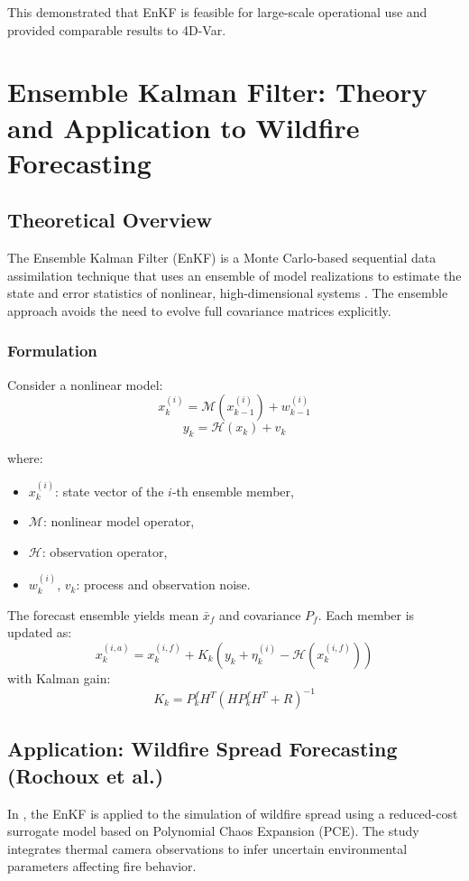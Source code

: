 \documentclass[a4paper]{article}
\begin{document}
This demonstrated that EnKF is feasible for large-scale operational use and provided comparable results to 4D-Var.

\section{Ensemble Kalman Filter: Theory and Application to Wildfire Forecasting}

\subsection{Theoretical Overview}

The Ensemble Kalman Filter (EnKF) is a Monte Carlo-based sequential data assimilation technique that uses an ensemble of model realizations to estimate the state and error statistics of nonlinear, high-dimensional systems \parencite{evensen1994sequential}. The ensemble approach avoids the need to evolve full covariance matrices explicitly.

\subsubsection*{Formulation}

Consider a nonlinear model:
\[
x_k^{(i)} = \mathcal{M}(x_{k-1}^{(i)}) + w_{k-1}^{(i)}
\]
\[
y_k = \mathcal{H}(x_k) + v_k
\]

where:
\begin{itemize}
  \item $x_k^{(i)}$: state vector of the $i$-th ensemble member,
  \item $\mathcal{M}$: nonlinear model operator,
  \item $\mathcal{H}$: observation operator,
  \item $w_k^{(i)}$, $v_k$: process and observation noise.
\end{itemize}

The forecast ensemble yields mean $\bar{x}_f$ and covariance $P_f$. Each member is updated as:
\[
x_k^{(i,a)} = x_k^{(i,f)} + K_k \left( y_k + \eta_k^{(i)} - \mathcal{H}(x_k^{(i,f)}) \right)
\]
with Kalman gain:
\[
K_k = P^{f}_{k} H^T (H P^{f}_{k} H^T + R)^{-1}
\]

\subsection{Application: Wildfire Spread Forecasting (Rochoux et al.)}

In \textcite{rochoux2020towards}, the EnKF is applied to the simulation of wildfire spread using a reduced-cost surrogate model based on Polynomial Chaos Expansion (PCE). The study integrates thermal camera observations to infer uncertain environmental parameters affecting fire behavior.
\end{document}
